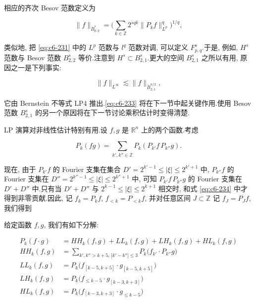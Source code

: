 相应的齐次 Besov 范数定义为

\begin{equation}
\|f\|_{\dot{B}_{p, q}^s} = \big(\sum_{k\in\mathbb{Z}} 2^{sqk} \|P_k f\|_{L^p}^q\big)^{1/q}, \label{eq:c6-232}
\end{equation}

类似地, 把 \eqref{eq:c6-231} 中的 $L^p$ 范数与 $l^q$ 范数对调, 可以定义 $F_{p, q}^s$.于是, 例如, $H^s$ 范数与 Besov 范数 $B_{2, 2}^s$ 等价.注意到 $H^s \subset B_{2, 1}^s$.更大的空间 $B_{2, 1}^s$ 之所以有用, 原因之一是下列事实:

\begin{equation}
\|f\|_{L^\infty} \lesssim \|f\|_{\dot{B}_{2, 1}^{n/2}}, \label{eq:c6-233}
\end{equation}

它由 Bernstein 不等式 LP4 推出.\eqref{eq:c6-233} 将在下一节中起关键作用.使用 Besov 范数 $B_{2, 1}^s$ 的另一个原因将在下一节讨论乘积估计时变得清楚.


LP 演算对非线性估计特别有用.设 $f, g$ 是 $\mathbb{R}^n$ 上的两个函数.考虑

\begin{equation}
P_k(fg) = \sum_{k', k''\in\mathbb{Z}} P_k(P_{k'} f\, P_{k''} g).\label{eq:c6-234}
\end{equation}

现在, 由于 $P_{k'} f$ 的 Fourier 支集在集合 $D' = 2^{k'-1} \leq |\xi| \leq 2^{k'+1}$ 中, $P_{k''} f$ 的 Fourier 支集在 $D'' = 2^{k''-1} \leq |\xi| \leq 2^{k''+1}$ 中, 可知 $P_{k'} f\, P_{k''} g$ 的 Fourier 支集在 $D' + D''$ 中.只有当 $D' + D''$ 与 $2^{k-1} \leq |\xi| \leq 2^{k+1}$ 相交时, 和式 \eqref{eq:c6-234} 中才得到非零贡献.因此, 记 $f_k = P_k f$, $f_{< k} = P_{< k} f$, 并对任意区间 $J \subset \mathbb{Z}$ 记 $f_J = P_J f$, 我们得到

\begin{lemma}\label{lem:c6-3.6}
给定函数 $f, g$, 我们有如下分解:

\begin{equation}
\begin{aligned}
P_k(f \cdot g) &= HH_k(f, g) + LL_k(f, g) + LH_k(f, g) + HL_k(f, g)\\
HH_k(f, g) &= \sum_{k', k'' > k+5, \, |k'-k''| \leq 3} P_k\big(f_{k'} \cdot P_{k''} g\big)\\
LL_k(f, g) &= P_k\big(f_{[k-5, k+5]} \cdot g_{[k-5, k+5]}\big)\\
LH_k(f, g) &= P_k\big(f_{\leq k-5} \cdot g_{[k-3, k+3]}\big)\\
HL_k(f, g) &= P_k\big(f_{[k-3, k+3]} \cdot g_{\leq k-5}\big)
\end{aligned}\label{eq:c6-235}
\end{equation}
\end{lemma}

